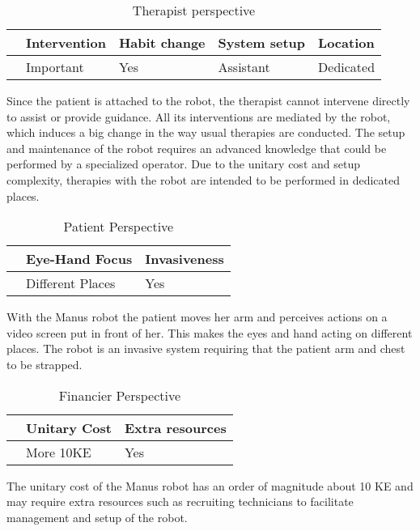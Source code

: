 \documentclass[preprint,authoryear,12pt]{elsarticle}
\begin{document}
\begin{table}[h]
\caption{Therapist perspective}
\center
\label{tab:theraper}
\begin{tabular}{|l|l|l|l|l|}
\hline
& Intervention & Habit change & System setup &	Location \\
\hline
\citep{LoAlbertC2010} & Important &  Yes	 & Assistant	 & Dedicated\\
\hline
\end{tabular}
\end{table}

Since the patient is attached to the robot, the therapist cannot intervene directly to assist or provide guidance. All its interventions are mediated by the robot, which induces a big change in the way usual therapies are conducted. The setup and maintenance of the robot requires an advanced knowledge that could be performed by a specialized operator. Due to the unitary cost and setup complexity, therapies with the robot are intended to be performed in dedicated places.

\begin{table}[h]
\caption{Patient Perspective}
\center
\label{tab:pataper}
\begin{tabular}{|l|l|l|}
\hline
& Eye-Hand  Focus & Invasiveness \\
\hline
\citep{LoAlbertC2010}  & Different Places &  Yes\\
\hline
\end{tabular}
\end{table}


With the Manus robot the patient moves her arm and perceives actions on a video screen put in front of her. This makes the eyes and hand acting on different places. The robot is an invasive system requiring that the patient arm and chest to be strapped.

\begin{table}[h]
\caption{Financier Perspective}
\center
\label{tab:finaper}
\begin{tabular}{|l|l|l|}
\hline
& Unitary Cost & Extra resources \\
\hline
\citep{LoAlbertC2010}  &  More 10KE &  Yes\\
\hline
\end{tabular}
\end{table}

The unitary cost of the Manus robot has an order of magnitude about 10 KE and may require extra resources such as recruiting technicians to facilitate management and setup of the robot.
 
\end{document}
